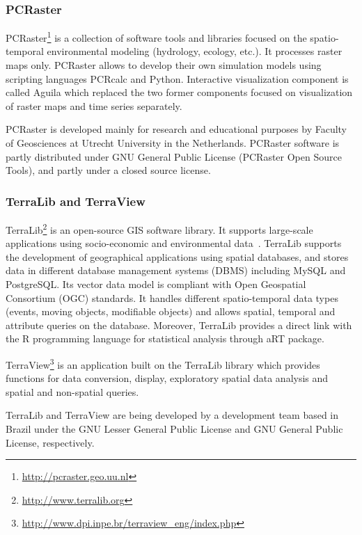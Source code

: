 \documentclass[a4paper,12pt,oneside]{book}
\begin{document}
\subsubsection{PCRaster}
PCRaster\footnote{\url{http://pcraster.geo.uu.nl}}
is a collection of software tools and libraries focused on the spatio-temporal
environmental modeling (hydrology, ecology, etc.). It processes raster maps only.
PCRaster allows to develop their own simulation models using scripting languages PCRcalc and Python.
Interactive visualization component is called Aguila
which replaced the two former components focused on visualization of raster maps
and time series separately.

PCRaster is developed mainly for research and educational purposes by
Faculty of Geosciences at Utrecht University in the Netherlands.
PCRaster software is partly distributed under GNU General Public License (PCRaster Open Source Tools),
and partly under a closed source license.

\subsubsection{TerraLib and TerraView}
TerraLib\footnote{\url{http://www.terralib.org}} is an open-source GIS software library.
It supports large-scale applications using socio-economic
and environmental data~\cite{camara2008terralib}.
TerraLib supports the development of geographical applications
using spatial databases, and stores data in different database management systems (DBMS)
including MySQL and PostgreSQL. Its vector data model is compliant with Open Geospatial
Consortium (OGC) standards. It handles different spatio-temporal data types (events,
moving objects, modifiable objects) and allows spatial, temporal and
attribute queries on the database. Moreover, TerraLib provides a  direct link with the
R programming language for statistical analysis through aRT package.

TerraView\footnote{\url{http://www.dpi.inpe.br/terraview_eng/index.php}}
is an application built on the TerraLib library
which provides functions for data conversion, display, exploratory spatial data
analysis and spatial and non-spatial queries.

TerraLib and TerraView are being developed by a development team based in Brazil
under the GNU Lesser General Public License and GNU General Public License, respectively.
\end{document}
